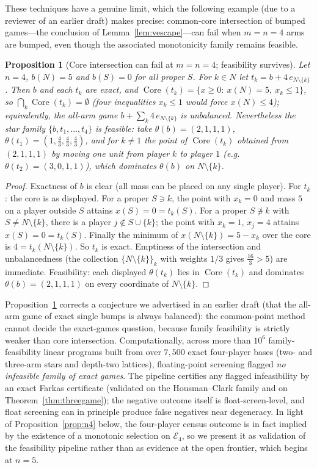 \documentclass[11pt]{article}
\newtheorem{proposition}[theorem]{Proposition}
\newcommand{\core}{\operatorname{Core}}
\begin{document}
These techniques have a genuine limit, which the following example (due to a
reviewer of an earlier draft) makes precise: common-core intersection of
bumped games---the conclusion of Lemma~\ref{lem:vescape}---can fail when
$m=n=4$ arms are bumped, even though the associated monotonicity family
remains feasible.

\begin{proposition}[Core intersection can fail at $m=n=4$; feasibility
survives]\label{prop:cx}
Let $n=4$, $b(N)=5$ and $b(S)=0$ for all proper $S$. For $k\in N$ let
$t_k=b+4\,e_{N\setminus\{k\}}$. Then $b$ and each $t_k$ are exact, and
$\core(t_k)=\{x\ge 0:\ x(N)=5,\ x_k\le 1\}$, so
$\bigcap_{k}\core(t_k)=\emptyset$ (four inequalities $x_k\le1$ would force
$x(N)\le4$); equivalently, the all-arm game
$b+\sum_k 4\,e_{N\setminus\{k\}}$ is unbalanced. Nevertheless the star
family $\{b,t_1,\dots,t_4\}$ is feasible: take $\theta(b)=(2,1,1,1)$,
$\theta(t_1)=(1,\tfrac43,\tfrac43,\tfrac43)$, and for $k\neq 1$ the point of
$\core(t_k)$ obtained from $(2,1,1,1)$ by moving one unit from player $k$ to
player $1$ (e.g.\ $\theta(t_2)=(3,0,1,1)$), which dominates $\theta(b)$ on
$N\setminus\{k\}$.
\end{proposition}

\begin{proof}
Exactness of $b$ is clear (all mass can be placed on any single player).
For $t_k$: the core is as displayed. For a proper $S\ni k$, the point with
$x_k=0$ and mass $5$ on a player outside $S$ attains $x(S)=0=t_k(S)$. For a
proper $S\not\ni k$ with $S\neq N\setminus\{k\}$, there is a player
$j\notin S\cup\{k\}$; the point with $x_k=1$, $x_j=4$ attains
$x(S)=0=t_k(S)$. Finally the minimum of $x(N\setminus\{k\})=5-x_k$ over the
core is $4=t_k(N\setminus\{k\})$. So $t_k$ is exact. Emptiness of the
intersection and unbalancedness (the collection $\{N\setminus\{k\}\}_k$ with
weights $1/3$ gives $\tfrac{16}3>5$) are immediate. Feasibility: each
displayed $\theta(t_k)$ lies in $\core(t_k)$ and dominates
$\theta(b)=(2,1,1,1)$ on every coordinate of $N\setminus\{k\}$.
\end{proof}

Proposition~\ref{prop:cx} corrects a conjecture we advertised in an earlier
draft (that the all-arm game of exact single bumps is always balanced): the
common-point method cannot decide the exact-games question, because family
feasibility is strictly weaker than core intersection. Computationally,
across more than $10^6$ family-feasibility linear programs built from over
$7{,}500$ exact four-player bases (two- and three-arm stars and depth-two
lattices), floating-point screening flagged \emph{no infeasible family of
exact games}. The pipeline certifies any flagged infeasibility by an exact
Farkas certificate (validated on the Housman--Clark family and on
Theorem~\ref{thm:threegame}); the negative outcome itself is
float-screen-level, and float screening can in principle produce false
negatives near degeneracy. In light of Proposition~\ref{prop:n4} below, the
four-player census outcome is in fact implied by the existence of a
monotonic selection on $\mathcal{E}_4$, so we present it as validation of
the feasibility pipeline rather than as evidence at the open frontier,
which begins at $n=5$.
\end{document}
